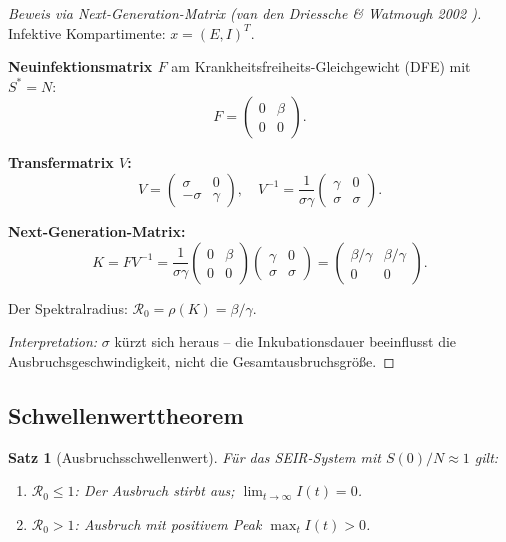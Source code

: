 ﻿\documentclass[12pt,a4paper]{article}
\theoremstyle{definition}
\theoremstyle{plain}
\newtheorem{satz}[definition]{Satz}
\theoremstyle{remark}
\begin{document}
\begin{proof}[Beweis via Next-Generation-Matrix (van den Driessche \& Watmough 2002 \cite{driessche2002})]
Infektive Kompartimente: $x = (E, I)^T$.

\textbf{Neuinfektionsmatrix $F$} am Krankheitsfreiheits-Gleichgewicht (DFE) mit $S^* = N$:
\[
  F = \begin{pmatrix} 0 & \beta \\ 0 & 0 \end{pmatrix}.
\]

\textbf{Transfermatrix $V$:}
\[
  V = \begin{pmatrix} \sigma & 0 \\ -\sigma & \gamma \end{pmatrix}, \quad
  V^{-1} = \frac{1}{\sigma \gamma}
    \begin{pmatrix} \gamma & 0 \\ \sigma & \sigma \end{pmatrix}.
\]

\textbf{Next-Generation-Matrix:}
\[
  K = FV^{-1}
    = \frac{1}{\sigma\gamma}\begin{pmatrix} 0 & \beta \\ 0 & 0 \end{pmatrix}
      \begin{pmatrix} \gamma & 0 \\ \sigma & \sigma \end{pmatrix}
    = \begin{pmatrix} \beta/\gamma & \beta/\gamma \\ 0 & 0 \end{pmatrix}.
\]

Der Spektralradius: $\mathcal{R}_0 = \rho(K) = \beta/\gamma$.

\textit{Interpretation:} $\sigma$ kürzt sich heraus -- die Inkubationsdauer beeinflusst
die Ausbruchsgeschwindigkeit, nicht die Gesamtausbruchsgröße.
\end{proof}

\subsection{Schwellenwerttheorem}

\begin{satz}[Ausbruchsschwellenwert]
\label{satz:schwelle}
Für das SEIR-System mit $S(0)/N \approx 1$ gilt:
\begin{enumerate}
  \item $\mathcal{R}_0 \leq 1$: Der Ausbruch stirbt aus; $\lim_{t\to\infty} I(t) = 0$.
  \item $\mathcal{R}_0 > 1$: Ausbruch mit positivem Peak $\max_t I(t) > 0$.
\end{enumerate}
\end{satz}
\end{document}
